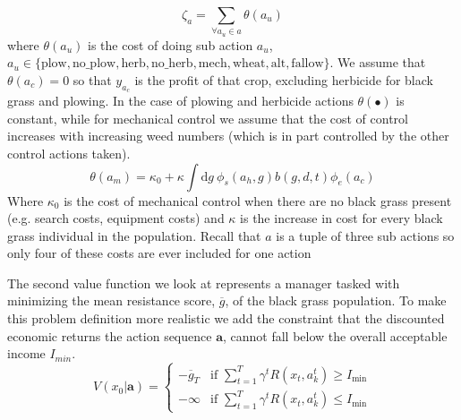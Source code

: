 \documentclass[12pt, a4paper]{article}
\begin{document}
\begin{equation}
	\zeta_{a} = \sum_{\forall a_u \in a} \theta(a_u)
\end{equation} 
where $\theta(a_u)$ is the cost of doing sub action $a_u$, $a_u \in \{\text{plow}, \text{no\_plow}, \text{herb}, \text{no\_herb}, \text{mech}, \text{wheat}, \text{alt}, \text{fallow}\}$. We assume that $\theta(a_c) = 0$ so that $y_{a_c}$ is the profit of that crop, excluding herbicide for black grass and plowing. In the case of plowing and herbicide actions $\theta(\bullet)$ is constant, while for mechanical control we assume that the cost of control increases with increasing weed numbers (which is in part controlled by the other control actions taken).
\begin{equation}\label{eq:cost_mech}
	\theta(a_m) = \kappa_0 + \kappa\int \text{d}g~ \phi_s(a_h, g)b(g, d, t)\phi_e(a_c)
\end{equation}    
Where $\kappa_0$ is the cost of mechanical control when there are no black grass present (e.g. search costs, equipment costs) and $\kappa$ is the increase in cost for every black grass individual in the population. Recall that $a$ is a tuple of three sub actions so only four of these costs are ever included for one action     

The second value function we look at represents a manager tasked with minimizing the mean resistance score, $\overline{g}$, of the black grass population. To make this problem definition more realistic we add the constraint that the discounted economic returns the action sequence $\mathbf{a}$, cannot fall below the overall acceptable income $I_{min}$.   
\begin{equation}\label{rewards:ds_g_min}
	V(x_0|\mathbf{a}) = \begin{cases}
	-\overline{g}_T &\text{if } \sum_{t = 1}^{T} \gamma^t R(x_t, a_k^t) \geq I_\text{min}\\
	-\infty &\text{if } \sum_{t = 1}^{T} \gamma^t R(x_t, a_k^t) \leq I_\text{min}    
	\end{cases}  
\end{equation}
\end{document}
